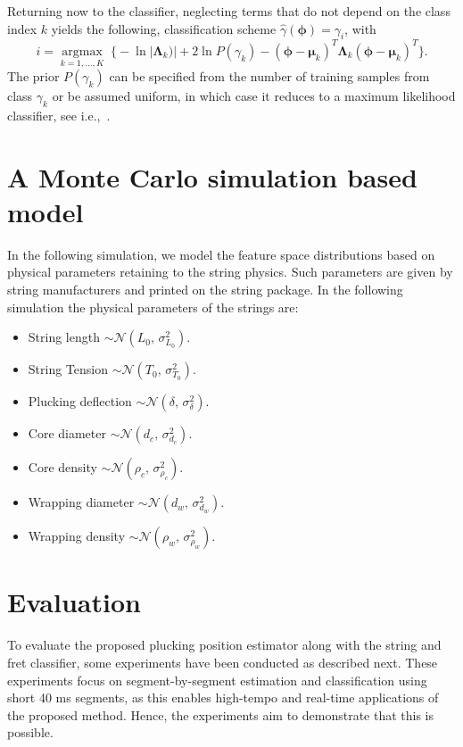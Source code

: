 \documentclass{article}
\begin{document}
\begin{sloppy}
%
Returning now to the classifier, neglecting terms that do not depend on the class index $k$ yields the following, classification scheme $\hat{\gamma}(\boldsymbol{\phi})={\gamma}_i$, with
%
\begin{equation}\label{eq:classifier}
  i=\underset{k=1,\dots,K}{\operatorname{argmax}}\;
\bigg\{ -\ln \lvert \boldsymbol{\Lambda}_k) \rvert + 2 \ln P(\gamma_k) - (\boldsymbol{\phi}-\boldsymbol{\mu}_k)^T \boldsymbol{\Lambda}_k (\boldsymbol{\phi}-\boldsymbol{\mu}_k)^T    %
\bigg\}.
\end{equation}
%
The prior $P(\gamma_k)$ can be specified from the number of training samples from class $\gamma_k$ or be assumed uniform, in which case it reduces to a maximum likelihood classifier, see i.e.,~\cite{mspr}.
%
\section{A Monte Carlo simulation based model}
In the following simulation, we model the feature space distributions based on physical parameters retaining to the string physics. Such parameters are given by string manufacturers and printed on the string package. In the following simulation the physical parameters of the strings are:
\begin{itemize}
    \item String length $\sim \mathcal{N}(L_0,\,\sigma_{L_0}^{2})$.
    \item String Tension $\sim \mathcal{N}(T_0,\,\sigma_{T_0}^{2})$.
    \item Plucking deflection $\sim \mathcal{N}(\delta,\,\sigma_{\delta}^{2})$.

    \item Core diameter $\sim \mathcal{N}(d_c,\,\sigma_{d_c}^{2})$.
    \item Core density $\sim \mathcal{N}(\rho_c,\,\sigma_{\rho_c}^{2})$.
    \item Wrapping diameter $\sim \mathcal{N}(d_w,\,\sigma_{d_w}^{2})$.
    \item Wrapping density $\sim \mathcal{N}(\rho_w,\,\sigma_{\rho_w}^{2})$.

\end{itemize}
%
%
%
%
\section{Evaluation} %
\label{sec:experiments}
To evaluate the proposed plucking position estimator along with the string and fret classifier, some experiments have been conducted as described next. These experiments focus on segment-by-segment estimation and classification using short 40 ms segments, as this enables high-tempo and real-time applications of the proposed method. Hence, the experiments aim to demonstrate that this is possible.
%
%
%
%
%


\end{sloppy}
\end{document}
